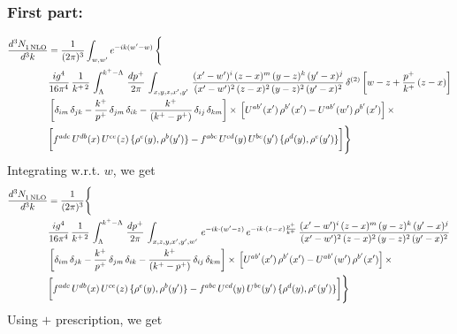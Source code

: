 \documentclass[9pt]{article}
\numberwithin{equation}{section}
\begin{document}
\subsubsection{First part:}
\begin{align}
    \frac{d^{3}N_{1\,\rm NLO}^{\rm}}{d^{3}k}  & = \frac{1}{(2\pi)^{3}}  \int_{w, w^\prime} e^{-ik(w^\prime-w)}\, \Bigg\{\notag \\ & \frac{ig^{4}}{16\pi^{4}}\, \frac{1}{k^{+\,2}}\,\int_{\Lambda}^{k^{+}-\Lambda}\, \frac{dp^{+}}{2\pi}\,\int_{x,y,z,x',y'}\,\frac{(x'-w')^{i}\,(z-x)^{m}\,(y-z)^{k}\,(y'-x)^{j}}{(x'-w')^{2}\,(z-x)^{2}\,(y-z)^{2}\,(y'-x)^{2}}\, \delta^{(2)}\left[w-z+\frac{p^{+}}{k^{+}}\,(z-x)\right]\notag \\ & \left[\delta_{im}\,\delta_{jk}-\frac{k^{+}}{p^{+}}\, \delta_{jm}\,\delta_{ik}-\frac{k^{+}}{(k^{+}-p^{+})}\, \delta_{ij}\,\delta_{km}\right]\times\, \left[U^{ab'}(x')\,\rho^{b'}(x')-U^{ab'}(w')\,\rho^{b'}(x')\right]\times\notag \\ & \bigg[f^{adc}\,U^{db}(x)\,U^{ce}(z)\, \{\rho^{e}(y),\rho^{b}(y')\}-f^{abc}\,U^{cd}(y)\,U^{be}(y')\, \{\rho^{d}(y),\rho^{e}(y')\}\bigg]\Bigg\}
\end{align}
Integrating w.r.t. $w$, we get
\begin{align}
     \frac{d^{3}N_{1\,\rm NLO}^{\rm}}{d^{3}k}  & = \frac{1}{(2\pi)^{3}} \Bigg\{\notag \\ &  \frac{ig^{4}}{16\pi^{4}}\, \frac{1}{k^{+\,2}}\,\int_{\Lambda}^{k^{+}-\Lambda}\, \frac{dp^{+}}{2\pi}\,\int_{x,z,y,x',y',w'}\,e^{-ik\cdot (w^\prime-z)}\,e^{-ik\cdot (z-x)\frac{p^{+}}{k^{+}}}\,\frac{(x'-w')^{i}\,(z-x)^{m}\,(y-z)^{k}\,(y'-x)^{j}}{(x'-w')^{2}\,(z-x)^{2}\,(y-z)^{2}\,(y'-x)^{2}}\,\notag \\ & \left[\delta_{im}\,\delta_{jk}-\frac{k^{+}}{p^{+}}\, \delta_{jm}\,\delta_{ik}-\frac{k^{+}}{(k^{+}-p^{+})}\, \delta_{ij}\,\delta_{km}\right]\times\, \left[U^{ab'}(x')\,\rho^{b'}(x')-U^{ab'}(w')\,\rho^{b'}(x')\right]\times\notag \\ & \bigg[f^{adc}\,U^{db}(x)\,U^{ce}(z)\, \{\rho^{e}(y),\rho^{b}(y')\}-f^{abc}\,U^{cd}(y)\,U^{be}(y')\, \{\rho^{d}(y),\rho^{e}(y')\}\bigg]\Bigg\}
\end{align}
Using $+$ prescription, we get
\end{document}
